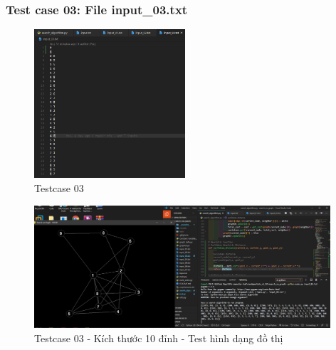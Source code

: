 \documentclass{article}
\begin{document}
\subsubsection{Test case 03: File input\_03.txt}
\begin{figure}[H]
\centering
\includegraphics[width=0.5\textwidth]{Test_Case_03_Content.png}
\caption{Testcase 03}
\end{figure}
\begin{figure}[H]
\centering
\includegraphics[width=0.98\textwidth]{Test_Case_03.png}
\caption{Testcase 03 - Kích thước 10 đỉnh - Test hình dạng đồ thị}
\end{figure}
\end{document}
